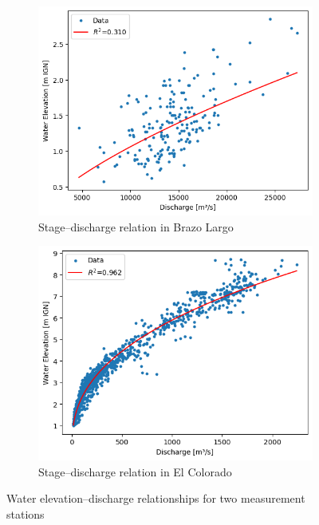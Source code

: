 \begin{figure}[h!]
    \centering

    \begin{subfigure}[t]{0.48\linewidth}
        \centering
        \includegraphics[width=\linewidth]{figures/ch5/wl discharge Brazo Largo.png}
        \caption{Stage–discharge relation in Brazo Largo}
        \label{fig:wl_discharge_brazo}
    \end{subfigure}
    \hfill
    \begin{subfigure}[t]{0.48\linewidth}
        \centering
        \includegraphics[width=\linewidth]{figures/ch5/wl discharge El Colorado.png}
        \caption{Stage–discharge relation in El Colorado}
        \label{fig:wl_discharge_colorado}
    \end{subfigure}

    \caption{Water elevation–discharge relationships for two measurement stations}
    \label{fig:waterleveldischarge}
\end{figure}




